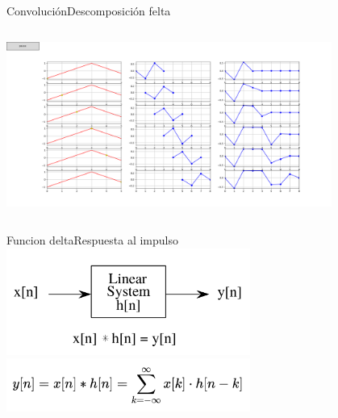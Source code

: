 \begin{frame}{Convolución}{Descomposición felta}
   \begin{columns}[c]
      \begin{column}{1\textwidth}
         \centering\includegraphics[width=0.8\textwidth]{4_clase/descomposicion_delta}
      \end{column}
   \end{columns}
   \vfill
\end{frame}
\begin{frame}{Funcion delta}{Respuesta al impulso}
   \centering\includegraphics[width=0.6\textwidth]{4_clase/entrada_conv_h}\\
   \centering\includegraphics[width=0.6\textwidth]{4_clase/convolucion_eq}
   \vfill
\end{frame}
